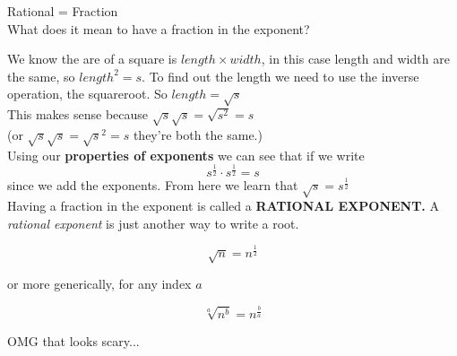 \documentclass[12pt]{article}
\begin{document}
Rational = Fraction \\

What does it mean to have a fraction in the exponent?\\

\begin{center}
\end{center}


We know the are of a square is $length \times width$, in this case length and width are the same, so $length^{2}=s$. To find out the length we need to use the inverse operation, the squareroot. So $length=\sqrt{s}$\\

This makes sense because $\sqrt{s} \sqrt{s} = \sqrt{s^2} = s$\\

(or $\sqrt{s} \sqrt{s} = \sqrt{s}^2=s$ they're both the same.)\\

Using our \textbf{properties of exponents} we can see that if we write $$s^{\frac{1}{2}} \cdot s^{\frac{1}{2}}=s$$ since we add the exponents. From here we learn that $\sqrt{s}=s^{\frac{1}{2}}$\\

Having a fraction in the exponent is called a \textbf{RATIONAL EXPONENT.} A \textit{rational exponent} is just another way to write a root. 

\begin{LARGE}
	$$\sqrt{n}= n^{\frac{1}{2}}$$

\end{LARGE}


or more generically, for any index $a$\\

\begin{LARGE}

	$$\sqrt[a]{n^b}=n^{\frac{b}{a}}$$ 
	
\end{LARGE}

OMG that looks scary...
\end{document}
